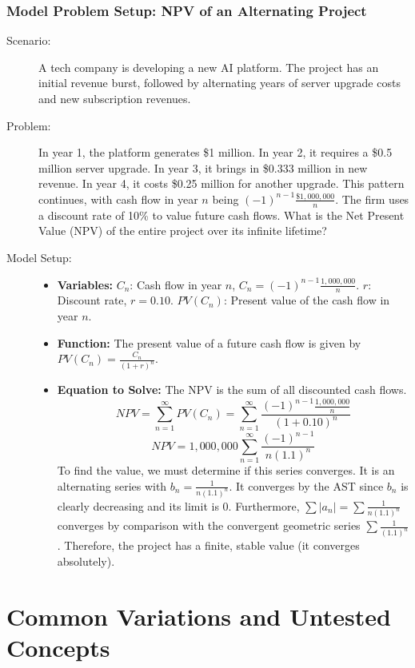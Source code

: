 \documentclass{article}
\begin{document}
\section{Model Problem Setup: NPV of an Alternating Project}
\begin{description}
    \item[Scenario:] A tech company is developing a new AI platform. The project has an initial revenue burst, followed by alternating years of server upgrade costs and new subscription revenues.
    \item[Problem:] In year 1, the platform generates \$1 million. In year 2, it requires a \$0.5 million server upgrade. In year 3, it brings in \$0.333 million in new revenue. In year 4, it costs \$0.25 million for another upgrade. This pattern continues, with cash flow in year $n$ being $(-1)^{n-1} \frac{\$1,000,000}{n}$. The firm uses a discount rate of 10\% to value future cash flows. What is the Net Present Value (NPV) of the entire project over its infinite lifetime?
    \item[Model Setup:]
    \begin{itemize}
        \item \textbf{Variables:}
        $C_n$: Cash flow in year $n$, $C_n = (-1)^{n-1} \frac{1,000,000}{n}$.
        $r$: Discount rate, $r = 0.10$.
        $PV(C_n)$: Present value of the cash flow in year $n$.
        
        \item \textbf{Function:} The present value of a future cash flow is given by $PV(C_n) = \frac{C_n}{(1+r)^n}$.
        
        \item \textbf{Equation to Solve:} The NPV is the sum of all discounted cash flows.
        \[ NPV = \sum_{n=1}^{\infty} PV(C_n) = \sum_{n=1}^{\infty} \frac{(-1)^{n-1} \frac{1,000,000}{n}}{(1+0.10)^n} \]
        \[ NPV = 1,000,000 \sum_{n=1}^{\infty} \frac{(-1)^{n-1}}{n(1.1)^n} \]
        To find the value, we must determine if this series converges. It is an alternating series with $b_n = \frac{1}{n(1.1)^n}$. It converges by the AST since $b_n$ is clearly decreasing and its limit is 0. Furthermore, $\sum|a_n| = \sum \frac{1}{n(1.1)^n}$ converges by comparison with the convergent geometric series $\sum \frac{1}{(1.1)^n}$. Therefore, the project has a finite, stable value (it converges absolutely).
    \end{itemize}
\end{description}

\part{Common Variations and Untested Concepts}
\end{document}
